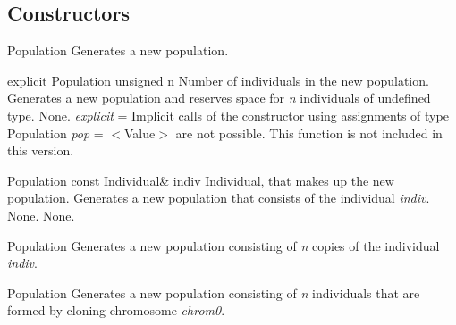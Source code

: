 \subsection{Constructors}

\setNormalInstance
\printEmptyMethod
{Population}
{Generates a new population.}

\vspace*{4ex}

\setNormalInstance
\printMethodWithOneParam
{explicit}
{Population}
{unsigned}
{n}
{Number of individuals in the new population.}
{Generates a new population and reserves space for {\em n} individuals
 of undefined type.}
{None.}
{{\em explicit} = Implicit calls of the constructor using assignments of type
Population {\em pop} = $<$Value$>$ are not possible. This function is
not included in this version.}

\clearpage

\setNormalInstance
\printMethodWithOneParam
{}
{Population}
{const Individual\&}
{indiv}
{Individual, that makes up the new population.}
{Generates a new population that consists of the individual {\em indiv}.}
{None.}
{None.}

\vspace*{4ex}

\setNormalInstance
\setCorrectWidthThree{8pt}
\printMethodWithParamsSaved
{}
{}
{Population}
{Generates a new population consisting of {\em n} copies of the
 individual {\em indiv}.}
{}
\setCorrectWidthThree{4pt}

\vspace*{4ex}

\setNormalInstance
\setCorrectWidthThree{8pt}
\printMethodWithParamsSaved
{}
{}
{Population}
{Generates a new population consisting of {\em n} individuals that
 are formed by cloning chromosome {\em chrom0}.}
{}
\setCorrectWidthThree{4pt}

